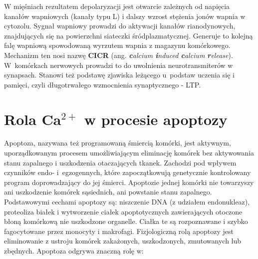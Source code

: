 W mięśniach rezultatem depolaryzacji jest otwarcie zależnych od napięcia kanałów wapniowych (kanały typu L) i dalszy wzrost stężenia jonów wapnia w cytozolu. Sygnał wapniowy prowadzi do aktywacji kanałów rianodynowych, znajdujących się na powierzchni siateczki śródplazmatycznej. Generuje to kolejną falę wapniową spowodowaną wyrzutem wapnia z magazynu komórkowego. Mechanizm ten nosi nazwę \textbf{CICR} (ang. \textit{\textit{\textbf{c}alcium \textbf{i}nduced \textbf{c}alcium \textbf{r}elease}}). W~komórkach nerwowych prowadzi to do uwolnienia neurotransmiterów w synapsach. Stanowi też podstawę zjawiska leżącego u~podstaw uczenia się i pamięci, czyli długotrwałego wzmocnienia synaptycznego - LTP.

\section{Rola Ca$^{2+}$ w procesie apoptozy}
\label{s:apoptoza}

Apoptoza, nazywana też programowaną śmiercią komórki, jest aktywnym, uporządkowanym procesem umożliwiającym eliminację komórek bez aktywowania stanu zapalnego i uszkodzenia otaczających tkanek. Zachodzi pod wpływem czynników endo- i~egzogennych, które zapoczątkowują genetycznie kontrolowany program doprowadzający do jej śmierci. Apoptozie jednej komórki nie towarzyszy ani uszkodzenie komórek sąsiednich, ani powstanie stanu zapalnego. Podstawowymi cechami apoptozy są: niszczenie DNA (z udziałem endonukleaz), proteoliza białek i wytworzenie ciałek apoptotycznych zawierających otoczone błoną komórkową nie uszkodzone organelle. Ciałka te są rozpoznawane i szybko fagocytowane przez monocyty i makrofagi. Fizjologiczną rolą apoptozy jest eliminowanie z ustroju komórek zakażonych, uszkodzonych, zmutowanych lub zbędnych. Apoptoza odgrywa znaczną rolę w:


